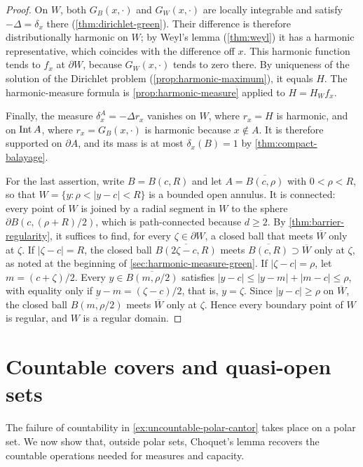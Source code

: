 \begin{proof}
On $W$, both $G_B(x,\cdot)$ and $G_W(x,\cdot)$ are locally integrable and satisfy $-\Delta=\delta_x$ there (\cref{thm:dirichlet-green}). Their difference is therefore distributionally harmonic on $W$; by Weyl's lemma (\cref{thm:weyl}) it has a harmonic representative, which coincides with the difference off $x$. This harmonic function tends to $f_x$ at $\partial W$, because $G_W(x,\cdot)$ tends to zero there. By uniqueness of the solution of the Dirichlet problem (\cref{prop:harmonic-maximum}), it equals $H$. The harmonic-measure formula is \cref{prop:harmonic-measure} applied to $H=H_Wf_x$.

Finally, the measure $\delta_x^A=-\Delta r_x$ vanishes on $W$, where $r_x=H$ is harmonic, and on $\operatorname{Int} A$, where $r_x=G_B(x,\cdot)$ is harmonic because $x\notin A$. It is therefore supported on $\partial A$, and its mass is at most $\delta_x(B)=1$ by \cref{thm:compact-balayage}.

For the last assertion, write $B=B(c,R)$ and let $A=\overline{B(c,\rho)}$ with $0<\rho<R$, so that $W=\{y:\rho<|y-c|<R\}$ is a bounded open annulus. It is connected: every point of $W$ is joined by a radial segment in $W$ to the sphere $\partial B(c,(\rho+R)/2)$, which is path-connected because $d\geq2$. By \cref{thm:barrier-regularity}, it suffices to find, for every $\zeta\in\partial W$, a closed ball that meets $\overline W$ only at $\zeta$. If $|\zeta-c|=R$, the closed ball $\overline{B(2\zeta-c,R)}$ meets $\overline{B(c,R)}\supset\overline W$ only at $\zeta$, as noted at the beginning of \cref{sec:harmonic-measure-green}. If $|\zeta-c|=\rho$, let $m=(c+\zeta)/2$. Every $y\in\overline{B(m,\rho/2)}$ satisfies $|y-c|\leq|y-m|+|m-c|\leq\rho$, with equality only if $y-m=(\zeta-c)/2$, that is, $y=\zeta$. Since $|y-c|\geq\rho$ on $\overline W$, the closed ball $\overline{B(m,\rho/2)}$ meets $\overline W$ only at $\zeta$. Hence every boundary point of $W$ is regular, and $W$ is a regular domain.
\end{proof}

\section{Countable covers and quasi-open sets}
\label{sec:fine-quasi-lindelof}
The failure of countability in \cref{ex:uncountable-polar-cantor} takes place on a polar set. We now show that, outside polar sets, Choquet's lemma recovers the countable operations needed for measures and capacity.

